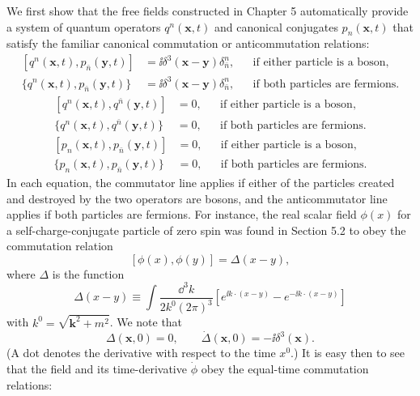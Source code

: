 We first show that the free fields constructed in Chapter 5 automatically
provide a system of quantum operators $q^n(\mathbf{x},t)$ and canonical conjugates
$p_n(\mathbf{x},t)$ that satisfy the familiar canonical commutation or anticommutation
relations:
\begin{equation}
\begin{aligned}
[q^n(\mathbf{x},t),p_{\bar n}(\mathbf{y},t)]
&=\ii\delta^3(\mathbf{x}-\mathbf{y})\delta^n_{\bar n},
&&\text{if either particle is a boson},\\
\{q^n(\mathbf{x},t),p_{\bar n}(\mathbf{y},t)\}
&=\ii\delta^3(\mathbf{x}-\mathbf{y})\delta^n_{\bar n},
&&\text{if both particles are fermions}.
\end{aligned}
\tag{7.1.1}\label{eq:7.1.1}
\end{equation}
\begin{equation}
\begin{aligned}
[q^n(\mathbf{x},t),q^{\bar n}(\mathbf{y},t)]&=0,
&&\text{if either particle is a boson},\\
\{q^n(\mathbf{x},t),q^{\bar n}(\mathbf{y},t)\}&=0,
&&\text{if both particles are fermions}.
\end{aligned}
\tag{7.1.2}\label{eq:7.1.2}
\end{equation}
\begin{equation}
\begin{aligned}
[p_n(\mathbf{x},t),p_{\bar n}(\mathbf{y},t)]&=0,
&&\text{if either particle is a boson},\\
\{p_n(\mathbf{x},t),p_{\bar n}(\mathbf{y},t)\}&=0,
&&\text{if both particles are fermions}.
\end{aligned}
\tag{7.1.3}\label{eq:7.1.3}
\end{equation}
In each equation, the commutator line applies if either of the particles
created and destroyed by the two operators are bosons, and the
anticommutator line applies if both particles are fermions. For instance, the real
scalar field $\phi(x)$ for a self-charge-conjugate particle of zero spin was
found in Section 5.2 to obey the commutation relation
\[
[\phi(x),\phi(y)]=\Delta(x-y),
\]
where $\Delta$ is the function
\[
\Delta(x-y)\equiv\int\frac{\dd^3k}{2k^0(2\pi)^3}
\left[e^{\ii k\cdot(x-y)}-e^{-\ii k\cdot(x-y)}\right]
\]
with $k^0=\sqrt{\mathbf{k}^2+m^2}$. We note that
\[
\Delta(\mathbf{x},0)=0,
\qquad
\dot\Delta(\mathbf{x},0)=-\ii\delta^3(\mathbf{x}).
\]
(A dot denotes the derivative with respect to the time $x^0$.) It is easy
then to see that the field and its time-derivative $\dot\phi$ obey the equal-time
commutation relations:
